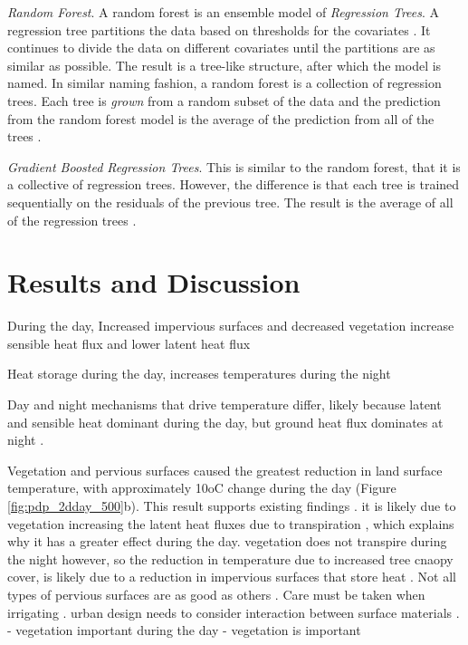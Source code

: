\documentclass[final,3p,times,twocolumn,sort&compress]{elsarticle}
\begin{document}
\textit{Random Forest}. A random forest is an ensemble model of \textit{Regression Trees}. A regression tree partitions the data based on thresholds for the covariates \cite{Breiman1984-hw}. It continues to divide the data on different covariates until the partitions are as similar as possible. 
The result is a tree-like structure, after which the model is named.
In similar naming fashion, a random forest is a collection of regression trees.
Each tree is \textit{grown} from a random subset of the data and the prediction from the random forest model is the average of the prediction from all of the trees \cite{Breiman2001-rt}.

\textit{Gradient Boosted Regression Trees}. This is similar to the random forest, that it is a collective of regression trees. 
However, the difference is that each tree is trained sequentially on the residuals of the previous tree.
The result is the average of all of the regression trees \cite{Geron2017-ek}.

\section{Results and Discussion}

During the day, Increased impervious surfaces and decreased vegetation increase sensible heat flux and lower latent heat flux \cite{Voogt2003-mm, Peng2012-iy, Zhou2014-wc}

Heat storage during the day, increases temperatures during the night \cite{Voogt2003-mm, Zhou2014-wc}

Day and night mechanisms that drive temperature differ, likely because latent and sensible heat dominant during the day, but ground heat flux dominates at night \cite{Zhou2014-wc, Voogt2003-mm}.

Vegetation and pervious surfaces caused the greatest reduction in land surface temperature, with approximately 10oC change during the day (Figure \ref{fig:pdp_2dday_500}b). 
This result supports existing findings \cite{Zhou2014-wc, Chun2018-so}.
it is likely due to vegetation increasing the latent heat fluxes due to transpiration \cite{Zhou2014-wc}, which explains why it has a greater effect during the day. 
vegetation does not transpire during the night however, so the reduction in temperature due to increased tree cnaopy cover, is likely due to a reduction in impervious surfaces that store heat \cite{Voogt2003-mm}. 
Not all types of pervious surfaces are as good as others \cite{Gober2009-im}. Care must be taken when irrigating \cite{Gober2009-im}.
urban design needs to consider interaction between surface materials \cite{Guhathakurta2010-ib}.
- vegetation important during the day \cite{Chun2017-mm, Peng2018-cp}
- vegetation is important \cite{Wang2019-tree}
\end{document}
